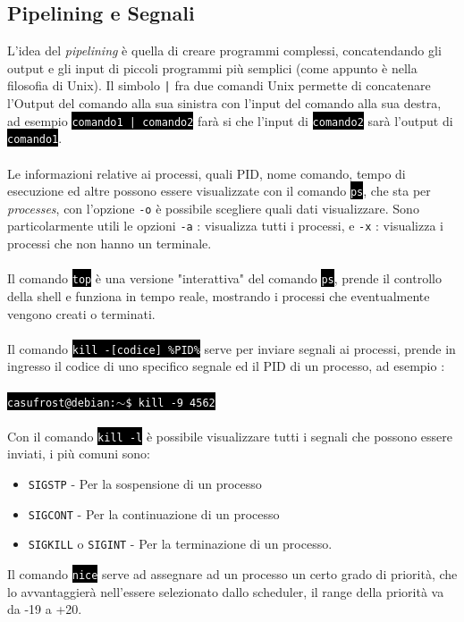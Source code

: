 \documentclass[12pt, letterpaper]{article}
\makeatletter
\newcommand{\code}[1]{\colorbox{light-gray}{\texttt{#1}}}
\newcommand{\shelll}[1]{\colorbox{black}{\textcolor{white}{\texttt{#1}}}}
\newcommand{\shell}[1]{\colorbox{black}{\textcolor{white}{\texttt{casufrost@debian:$\sim$\$ #1}}}}
\newcommand{\acc}{\\\hphantom{}\\}
\makeatother
\begin{document}
\subsection{Pipelining e Segnali}
L'idea del \textit{pipelining} è quella di creare programmi complessi, concatendando gli output e gli input di piccoli 
programmi più semplici (come appunto è nella filosofia di Unix). Il simbolo \code{|} fra due comandi Unix permette di 
concatenare l'Output del comando alla sua sinistra con l'input del comando alla sua destra, ad esempio \shelll{comando1 | comando2}
farà si che l'input di \shelll{comando2} sarà l'output di \shelll{comando1}. \acc Le informazioni relative ai processi, quali PID, 
nome comando, tempo di esecuzione ed altre possono essere visualizzate con il comando \shelll{ps}, che sta per \textit{processes},
con l'opzione \code{-o} è possibile scegliere quali dati visualizzare. Sono particolarmente utili le opzioni \code{-a} : visualizza 
tutti i processi, e \code{-x} : visualizza i processi che non hanno un terminale.\acc
Il comando \shelll{top} è una versione "interattiva" del comando \shelll{ps}, prende il controllo della shell e funziona in
tempo reale, mostrando i processi che eventualmente vengono creati o terminati.\acc 
Il comando \shelll{kill -[codice] \%PID\%} serve per inviare segnali ai processi, prende in ingresso il codice di uno specifico 
segnale ed il PID di un processo, ad esempio : \acc \shell{kill -9 4562}\acc 
Con il comando \shelll{kill -l} è possibile visualizzare tutti i segnali che possono essere inviati, i più 
comuni sono: \begin{itemize}
    \item \code{SIGSTP} - Per la sospensione di un processo 
    \item \code{SIGCONT} - Per la continuazione di un processo 
    \item \code{SIGKILL} o \code{SIGINT} - Per la terminazione di un processo.
\end{itemize}
Il comando \shelll{nice} serve ad assegnare ad un processo un certo grado di priorità, che lo avvantaggierà nell'essere 
selezionato dallo scheduler, il range della priorità va da -19 a +20.
\end{document}
